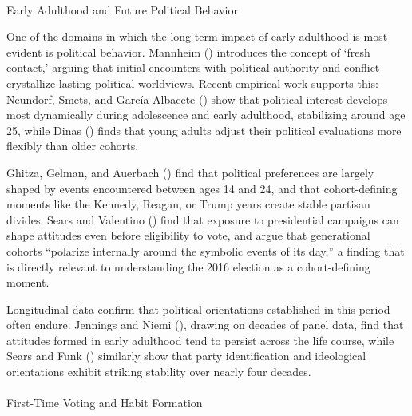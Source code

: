 \documentclass[
  10pt,
  letterpaper,
  DIV=11,
  numbers=noendperiod]{scrartcl}
\makeatletter
\let\oldparagraph\paragraph
\renewcommand{\paragraph}{
    \@ifstar
      \xxxParagraphStar
      \xxxParagraphNoStar
  }
\newcommand{\xxxParagraphStar}[1]{\oldparagraph*{#1}\mbox{}}
\newcommand{\xxxParagraphNoStar}[1]{\oldparagraph{#1}\mbox{}}
\makeatother
\begin{document}
\paragraph{Early Adulthood and Future Political
Behavior}\label{early-adulthood-and-future-political-behavior}

One of the domains in which the long-term impact of early adulthood is
most evident is political behavior. Mannheim
() introduces the concept of `fresh
contact,' arguing that initial encounters with political authority and
conflict crystallize lasting political worldviews. Recent empirical work
supports this: Neundorf, Smets, and García-Albacete
() show that political interest
develops most dynamically during adolescence and early adulthood,
stabilizing around age 25, while Dinas ()
finds that young adults adjust their political evaluations more flexibly
than older cohorts.

Ghitza, Gelman, and Auerbach () find that
political preferences are largely shaped by events encountered between
ages 14 and 24, and that cohort-defining moments like the Kennedy,
Reagan, or Trump years create stable partisan divides. Sears and
Valentino () find that exposure to
presidential campaigns can shape attitudes even before eligibility to
vote, and argue that generational cohorts ``polarize internally around
the symbolic events of its day,'' a finding that is directly relevant to
understanding the 2016 election as a cohort-defining moment.

Longitudinal data confirm that political orientations established in
this period often endure. Jennings and Niemi
(), drawing on decades of panel data,
find that attitudes formed in early adulthood tend to persist across the
life course, while Sears and Funk ()
similarly show that party identification and ideological orientations
exhibit striking stability over nearly four decades.

\paragraph{First-Time Voting and Habit
Formation}\label{first-time-voting-and-habit-formation}
\end{document}
